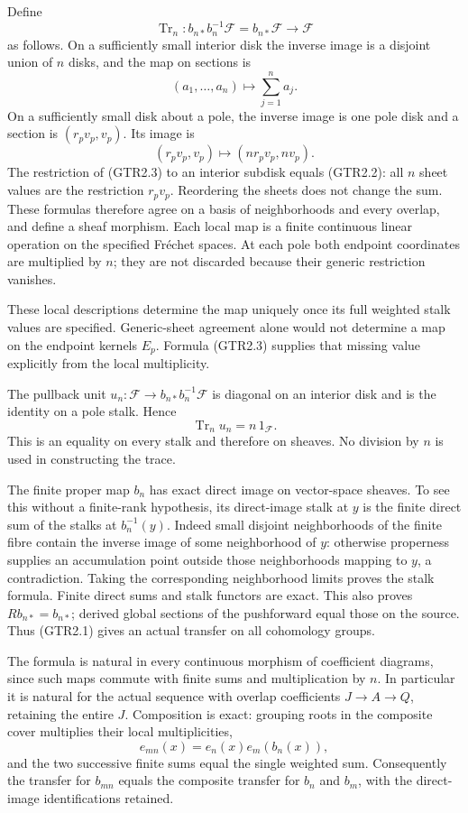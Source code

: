 Define \[
\operatorname{Tr}_n:b_{n*}b_n^{-1}\mathscr F=b_{n*}\mathscr F\longrightarrow\mathscr F
\tag{GTR2.1}
\] as follows. On a sufficiently small interior disk the inverse image
is a disjoint union of \(n\) disks, and the map on sections is \[
(a_1,\ldots,a_n)\longmapsto\sum_{j=1}^n a_j.
\tag{GTR2.2}
\] On a sufficiently small disk about a pole, the inverse image is one
pole disk and a section is \((r_pv_p,v_p)\). Its image is \[
(r_pv_p,v_p)\longmapsto(nr_pv_p,nv_p).
\tag{GTR2.3}
\] The restriction of (GTR2.3) to an interior subdisk equals (GTR2.2):
all \(n\) sheet values are the restriction \(r_pv_p\). Reordering the
sheets does not change the sum. These formulas therefore agree on a
basis of neighborhoods and every overlap, and define a sheaf morphism.
Each local map is a finite continuous linear operation on the specified
Fréchet spaces. At each pole both endpoint coordinates are multiplied by
\(n\); they are not discarded because their generic restriction
vanishes.

These local descriptions determine the map uniquely once its full
weighted stalk values are specified. Generic-sheet agreement alone would
not determine a map on the endpoint kernels \(E_p\). Formula (GTR2.3)
supplies that missing value explicitly from the local multiplicity.

The pullback unit \(u_n:\mathscr F\to b_{n*}b_n^{-1}\mathscr F\) is
diagonal on an interior disk and is the identity on a pole stalk. Hence
\[
\boxed{\operatorname{Tr}_n u_n=n\,1_{\mathscr F}.}
\tag{GTR2.4}
\] This is an equality on every stalk and therefore on sheaves. No
division by \(n\) is used in constructing the trace.

The finite proper map \(b_n\) has exact direct image on vector-space
sheaves. To see this without a finite-rank hypothesis, its direct-image
stalk at \(y\) is the finite direct sum of the stalks at
\(b_n^{-1}(y)\). Indeed small disjoint neighborhoods of the finite fibre
contain the inverse image of some neighborhood of \(y\): otherwise
properness supplies an accumulation point outside those neighborhoods
mapping to \(y\), a contradiction. Taking the corresponding neighborhood
limits proves the stalk formula. Finite direct sums and stalk functors
are exact. This also proves \(Rb_{n*}=b_{n*}\); derived global sections
of the pushforward equal those on the source. Thus (GTR2.1) gives an
actual transfer on all cohomology groups.

The formula is natural in every continuous morphism of coefficient
diagrams, since such maps commute with finite sums and multiplication by
\(n\). In particular it is natural for the actual sequence with overlap
coefficients \(J\to A\to Q\), retaining the entire \(J\). Composition is
exact: grouping roots in the composite cover multiplies their local
multiplicities, \[
e_{mn}(x)=e_n(x)e_m(b_n(x)),
\] and the two successive finite sums equal the single weighted sum.
Consequently the transfer for \(b_{mn}\) equals the composite transfer
for \(b_n\) and \(b_m\), with the direct-image identifications retained.


